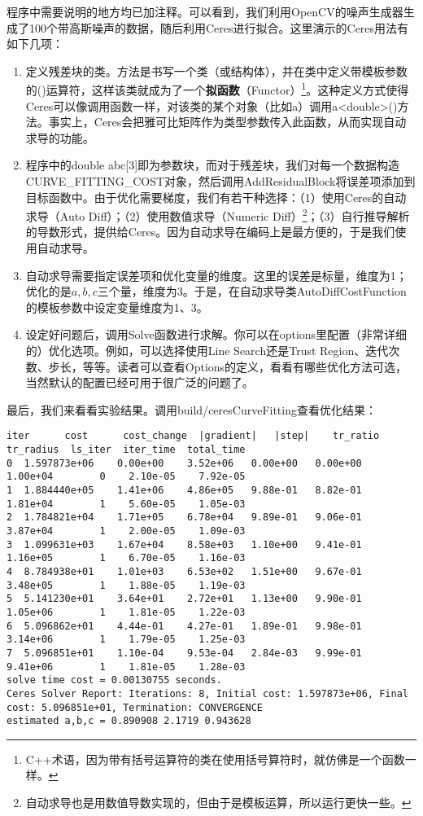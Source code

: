 程序中需要说明的地方均已加注释。可以看到，我们利用OpenCV的噪声生成器生成了100个带高斯噪声的数据，随后利用Ceres进行拟合。这里演示的Ceres用法有如下几项：

\begin{enumerate}
	\item 定义残差块的类。方法是书写一个类（或结构体），并在类中定义带模板参数的()运算符，这样该类就成为了一个\textbf{拟函数}（Functor）\footnote{C++术语，因为带有括号运算符的类在使用括号算符时，就仿佛是一个函数一样。}。这种定义方式使得Ceres可以像调用函数一样，对该类的某个对象（比如a）调用a<double>()方法。事实上，Ceres会把雅可比矩阵作为类型参数传入此函数，从而实现自动求导的功能。
	\item 程序中的double abc[3]即为参数块，而对于残差块，我们对每一个数据构造CURVE\_FITTING\_COST对象，然后调用AddResidualBlock将误差项添加到目标函数中。由于优化需要梯度，我们有若干种选择：（1）使用Ceres的自动求导（Auto Diff）；（2）使用数值求导（Numeric Diff）\footnote{自动求导也是用数值导数实现的，但由于是模板运算，所以运行更快一些。}；（3）自行推导解析的导数形式，提供给Ceres。因为自动求导在编码上是最方便的，于是我们使用自动求导。
	\item 自动求导需要指定误差项和优化变量的维度。这里的误差是标量，维度为1；优化的是$a,b,c$三个量，维度为3。于是，在自动求导类AutoDiffCostFunction的模板参数中设定变量维度为1、3。
	\item 设定好问题后，调用Solve函数进行求解。你可以在options里配置（非常详细的）优化选项。例如，可以选择使用Line Search还是Trust Region、迭代次数、步长，等等。读者可以查看Options的定义，看看有哪些优化方法可选，当然默认的配置已经可用于很广泛的问题了。
\end{enumerate}

最后，我们来看看实验结果。调用build/ceresCurveFitting查看优化结果：
\begin{lstlisting}
iter      cost      cost_change  |gradient|   |step|    tr_ratio  tr_radius  ls_iter  iter_time  total_time
0  1.597873e+06    0.00e+00    3.52e+06   0.00e+00   0.00e+00  1.00e+04        0    2.10e-05    7.92e-05
1  1.884440e+05    1.41e+06    4.86e+05   9.88e-01   8.82e-01  1.81e+04        1    5.60e-05    1.05e-03
2  1.784821e+04    1.71e+05    6.78e+04   9.89e-01   9.06e-01  3.87e+04        1    2.00e-05    1.09e-03
3  1.099631e+03    1.67e+04    8.58e+03   1.10e+00   9.41e-01  1.16e+05        1    6.70e-05    1.16e-03
4  8.784938e+01    1.01e+03    6.53e+02   1.51e+00   9.67e-01  3.48e+05        1    1.88e-05    1.19e-03
5  5.141230e+01    3.64e+01    2.72e+01   1.13e+00   9.90e-01  1.05e+06        1    1.81e-05    1.22e-03
6  5.096862e+01    4.44e-01    4.27e-01   1.89e-01   9.98e-01  3.14e+06        1    1.79e-05    1.25e-03
7  5.096851e+01    1.10e-04    9.53e-04   2.84e-03   9.99e-01  9.41e+06        1    1.81e-05    1.28e-03
solve time cost = 0.00130755 seconds. 
Ceres Solver Report: Iterations: 8, Initial cost: 1.597873e+06, Final cost: 5.096851e+01, Termination: CONVERGENCE
estimated a,b,c = 0.890908 2.1719 0.943628 
\end{lstlisting}

